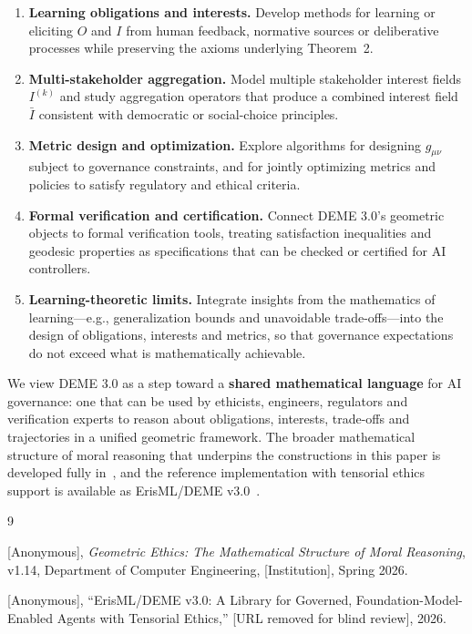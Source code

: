 \documentclass[12pt]{article}
\theoremstyle{remark}
\begin{document}
\begin{enumerate}
    \item \textbf{Learning obligations and interests.}
    Develop methods for learning or eliciting $O$ and $I$ from human feedback, normative sources or deliberative processes while preserving the axioms underlying Theorem~2.

    \item \textbf{Multi-stakeholder aggregation.}
    Model multiple stakeholder interest fields $I^{(k)}$ and study aggregation operators that produce a combined interest field $\bar{I}$ consistent with democratic or social-choice principles.

    \item \textbf{Metric design and optimization.}
    Explore algorithms for designing $g_{\mu\nu}$ subject to governance constraints, and for jointly optimizing metrics and policies to satisfy regulatory and ethical criteria.

    \item \textbf{Formal verification and certification.}
    Connect DEME 3.0's geometric objects to formal verification tools, treating satisfaction inequalities and geodesic properties as specifications that can be checked or certified for AI controllers.

    \item \textbf{Learning-theoretic limits.}
    Integrate insights from the mathematics of learning---e.g., generalization bounds and unavoidable trade-offs---into the design of obligations, interests and metrics, so that governance expectations do not exceed what is mathematically achievable.
\end{enumerate}

We view DEME 3.0 as a step toward a \textbf{shared mathematical language} for AI governance: one that can be used by ethicists, engineers, regulators and verification experts to reason about obligations, interests, trade-offs and trajectories in a unified geometric framework. The broader mathematical structure of moral reasoning that underpins the constructions in this paper is developed fully in~\cite{bond2026ge}, and the reference implementation with tensorial ethics support is available as ErisML/DEME v3.0~\cite{bond2026erisml}.

\begin{thebibliography}{9}

[Anonymous], \emph{Geometric Ethics: The Mathematical Structure of Moral Reasoning}, v1.14, Department of Computer Engineering, [Institution], Spring 2026.

[Anonymous], ``ErisML/DEME v3.0: A Library for Governed, Foundation-Model-Enabled Agents with Tensorial Ethics,'' [URL removed for blind review], 2026.

\end{thebibliography}
\end{document}
